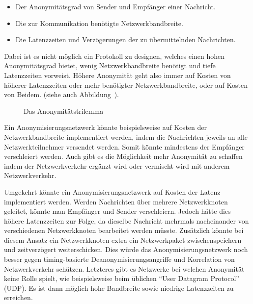 \begin{itemize}
    \item Der Anonymitätsgrad von Sender und Empfänger einer Nachricht.
    \item Die zur Kommunikation benötigte Netzwerkbandbreite.
    \item Die Latenzzeiten und Verzögerungen der zu übermittelnden Nachrichten.
\end{itemize}

Dabei ist es nicht möglich ein Protokoll zu designen, welches einen hohen Anonymitätsgrad bietet, wenig Netzwerkbandbreite benötigt und tiefe Latenzzeiten vorweist. \parencite[S.~1]{das_anonymity_2018}
Höhere Anonymität geht also immer auf Kosten von höherer Latenzzeiten oder mehr benötigter Netzwerkbandbreite, oder auf Kosten von Beidem. 
(siehe auch Abbildung~).

\begin{figure}[H]
    \centering
    \caption{Das Anonymitätstrilemma}\label{fig:anonimitytrilemma}
\end{figure}

Ein Anonymisierungsnetzwerk könnte beispielsweise auf Kosten der Netzwerkbandbreite implementiert werden, indem die Nachrichten jeweils an alle Netzwerkteilnehmer versendet werden.
Somit könnte mindestens der Empfänger verschleiert werden.
Auch gibt es die Möglichkeit mehr Anonymität zu schaffen indem der Netzwerkverkehr ergänzt wird
oder vermischt wird mit anderem Netzwerkverkehr.

Umgekehrt könnte ein Anonymisierungsnetzwerk auf Kosten der Latenz implementiert werden.
Werden Nachrichten über mehrere Netzwerkknoten geleitet, könnte man Empfänger und Sender verschleiern.
Jedoch hätte dies höhere Latenzzeiten zur Folge,
da dieselbe Nachricht mehrmals nacheinander von verschiedenen Netzwerkknoten bearbeitet werden müsste.
Zusätzlich könnte bei diesem Ansatz ein Netzwerkknoten extra ein Netzwerkpaket zwischenspeichern und zeitverzögert weiterschicken.
Dies würde das Anonymisierungsnetzwerk noch besser gegen timing-basierte Deanonymisierungsangriffe und Korrelation von Netzwerkverkehr schützen.
Letzteres gibt es Netzwerke bei welchen Anonymität keine Rolle spielt, wie beispielsweise beim üblichen ``User Datagram Protocol'' (UDP).
Es ist dann möglich hohe Bandbreite sowie niedrige Latenzzeiten zu erreichen.

